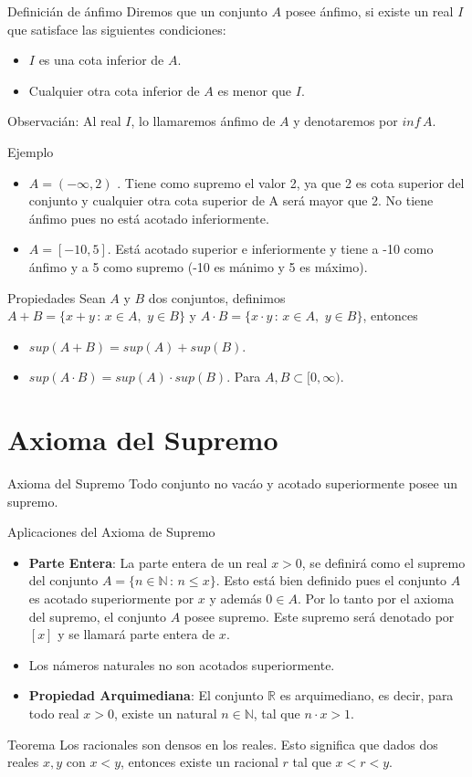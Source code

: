\documentclass[5pt]{article} %
\begin{document}
{Definicián de ánfimo}
	Diremos que un conjunto $A$ posee ánfimo, si existe un real $I$ que satisface
	las siguientes condiciones:
	\begin{itemize}
		\item $I$ es una cota inferior de $A$.
		\item Cualquier otra cota inferior de $A$ es menor que $I$.
	\end{itemize}
Observacián: Al real $I$, lo llamaremos ánfimo de $A$ y denotaremos por $inf\,A$.




	{Ejemplo}
		\begin{itemize}
			\item $A = (-\infty, 2)$ . Tiene como supremo el valor 2, ya que 2 es cota superior del conjunto y
			cualquier otra cota superior de A será mayor que 2. No tiene ánfimo pues no está acotado inferiormente.
			\item  $A = [-10, 5]$. Está acotado superior e inferiormente y tiene a -10 como ánfimo y a 5 como supremo (-10 es mánimo y 5 es máximo).
		\end{itemize}
	

		{Propiedades}
		Sean $A$ y $B$ dos conjuntos, definimos $A + B = \{x + y\, :\, x \in A,\,\, y\in B\}$ y $A \cdot B =
		\{x \cdot y \,: \,x \in A,\,\, y \in B\}$, entonces
		\begin{itemize}
			\item $sup(A + B) = sup(A) + sup(B)$.
			\item $sup(A \cdot B) = sup(A) \cdot sup(B)$. Para $A,B \subset [0,\infty)$.
		\end{itemize}



\section{Axioma del Supremo}
	{Axioma del Supremo}
			Todo conjunto no vacáo y acotado superiormente posee un supremo.


{Aplicaciones del Axioma de Supremo}
\begin{itemize}
	\item {\bf Parte Entera}: La parte entera de un real $x > 0$, se definirá como el supremo del	conjunto $A = \{n \in \mathbb{N}\, :\, n \leq x\}$. Esto está bien definido pues el conjunto $A$ es acotado superiormente por $x$ y además $0\in A$. Por lo tanto por el axioma del supremo, el conjunto $A$ posee supremo. Este
	supremo será denotado por $[x]$ y se llamará parte entera de $x$.

	\item Los námeros naturales no son acotados superiormente.

	\item {\bf Propiedad Arquimediana}: El conjunto $\mathbb{R}$ es arquimediano, es decir, para todo real $x > 0$, existe un natural $n \in \mathbb{N}$, tal que $n \cdot x > 1$.

\end{itemize}






	{Teorema}
Los racionales son densos en los reales. Esto significa que dados dos reales $x, y$
con $x < y$, entonces existe un racional $r$ tal que $x < r < y$.
\end{document}
